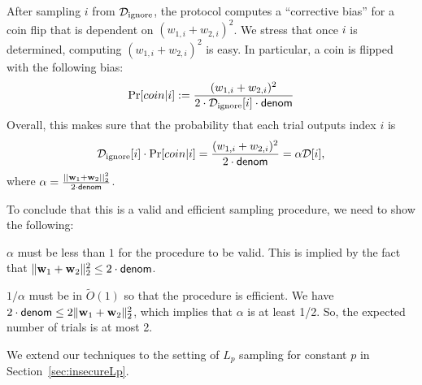 
\item After sampling $i$ from ${\cal D}_{\mathrm{ignore}}$, the protocol computes a
``corrective bias'' for a coin flip that is dependent on $(w_{1,i} + w_{2,i})^2$. We stress that once $i$ is determined,
computing $(w_{1,i} + w_{2,i})^2$ is easy. In particular, a coin is
flipped with the following bias:
$$ \Pr[ coin | i] := \frac{(w_{1,i} + w_{2,i})^2}{2 \cdot {\cal D}_{\mathrm{ignore}}[i] \cdot \mathsf{denom}}  $$
\EEN
Overall, this makes sure that the probability that each trial outputs
index $i$ is 
$$ {\cal D}_{\mathrm{ignore}}[i] \cdot \Pr[coin|i]  = \frac{(w_{1,i} + w_{2,i})^2}{2 \cdot \mathsf{denom}} = \alpha \mathcal{D}[i],$$
where $\alpha = \frac{||\mathbf{w}_1 + \mathbf{w}_2||_2^2}{2 \cdot \mathsf{denom}}$.

To conclude that this is a valid and efficient sampling procedure, we need to show the following:
\BI
\item $\alpha$ must be less than $1$ for the procedure to be valid. This is implied by the fact that
$\|\mathbf{w}_1 + \mathbf{w}_2 \|_2^2 \le 2 \cdot \mathsf{denom}$. 
\item $1/\alpha$ must be in $\tilde{O}(1)$ so that the procedure is efficient. We have $2 \cdot \mathsf{denom} \le 2 \|\mathbf{w}_1 + \mathbf{w}_2 \|_2^2$, which implies that $\alpha$ is at least 1/2. So, the expected number of trials is at most 2. 
\EI

We extend our techniques to the setting of $L_p$
sampling for constant $p$ in Section~\ref{sec:insecureLp}.



